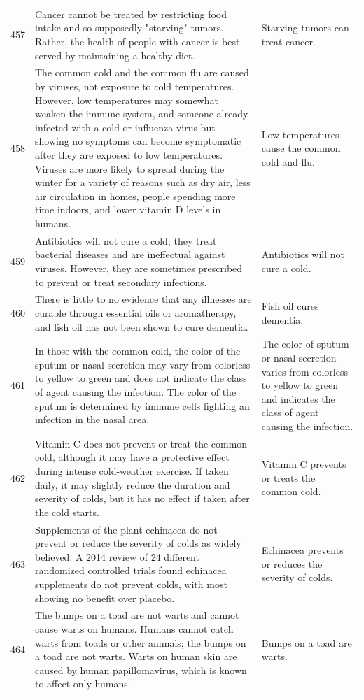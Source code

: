 \begin{tabular}{c|p{}|p{}}
457 & Cancer cannot be treated by restricting food intake and so supposedly "starving" tumors. Rather, the health of people with cancer is best served by maintaining a healthy diet. & Starving tumors can treat cancer. \\
458 & The common cold and the common flu are caused by viruses, not exposure to cold temperatures. However, low temperatures may somewhat weaken the immune system, and someone already infected with a cold or influenza virus but showing no symptoms can become symptomatic after they are exposed to low temperatures. Viruses are more likely to spread during the winter for a variety of reasons such as dry air, less air circulation in homes, people spending more time indoors, and lower vitamin D levels in humans. & Low temperatures cause the common cold and flu. \\
459 & Antibiotics will not cure a cold; they treat bacterial diseases and are ineffectual against viruses. However, they are sometimes prescribed to prevent or treat secondary infections. & Antibiotics will not cure a cold. \\
460 & There is little to no evidence that any illnesses are curable through essential oils or aromatherapy, and fish oil has not been shown to cure dementia. & Fish oil cures dementia. \\
461 & In those with the common cold, the color of the sputum or nasal secretion may vary from colorless to yellow to green and does not indicate the class of agent causing the infection. The color of the sputum is determined by immune cells fighting an infection in the nasal area. & The color of sputum or nasal secretion varies from colorless to yellow to green and indicates the class of agent causing the infection. \\
462 & Vitamin C does not prevent or treat the common cold, although it may have a protective effect during intense cold-weather exercise. If taken daily, it may slightly reduce the duration and severity of colds, but it has no effect if taken after the cold starts. & Vitamin C prevents or treats the common cold. \\
463 & Supplements of the plant echinacea do not prevent or reduce the severity of colds as widely believed. A 2014 review of 24 different randomized controlled trials found echinacea supplements do not prevent colds, with most showing no benefit over placebo. & Echinacea prevents or reduces the severity of colds. \\
464 & The bumps on a toad are not warts and cannot cause warts on humans. Humans cannot catch warts from toads or other animals; the bumps on a toad are not warts. Warts on human skin are caused by human papillomavirus, which is known to affect only humans. & Bumps on a toad are warts. \\

\end{tabular}

